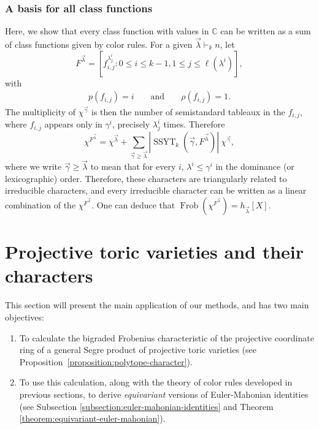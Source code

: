 \documentclass[a4paper,12pt]{amsart}
\theoremstyle{plain}
\theoremstyle{definition}
\theoremstyle{remark}
\DeclareMathOperator{\Frob}{Frob}
\DeclareMathOperator{\SSYT}{SSYT}
\begin{document}
\subsubsection{A basis for all class functions} \label{subsection:basis}
Here, we show that every class function with values in $\mathbb{C}$ can be written as a sum of class functions given by color rules. 
For a given $\vec{\lambda} \vdash_k n$, let 
\[
F^{\vec{\lambda}} = \left[ f_{i,j}^{\lambda^i_j} : 0\leq i \leq k-1 , 1\leq j \leq \ell(\lambda^i)\right],
\]
with 
\begin{align*}
p(f_{i,j}) = i && \text{ and } && \rho(f_{i,j}) = 1.
\end{align*}
The multiplicity of $\chi^{\vec{\gamma}}$ is then the number of semistandard tableaux in the $f_{i,j}$, where $f_{i,j}$ appears only in $\gamma^i$, precisely $\lambda^i_j$ times.
Therefore
\[
\chi^{F^{\vec{\lambda}}} = \chi^{\vec{\lambda}} + \sum_{\vec{\gamma} \geq \vec{\lambda}} |\SSYT_k(\vec{\gamma}, F^{\vec{\lambda}})| ~ \chi^{\vec{\gamma}}, 
\]
where we write $\vec{\gamma} \geq \vec{\lambda}$ to mean that for every $i$, $\lambda^i \leq \gamma^i$ in the dominance (or lexicographic) order.
Therefore, these characters are triangularly related to irreducible characters, and every irreducible character can be written as a linear combination of the $\chi^{F^{\vec{\lambda}}}$. One can deduce that $\Frob(\chi^{F^{\vec{\lambda}}}) = h_{\vec{\lambda}}[X]$.

\section{Projective toric varieties and their characters}\label{section:semigroup-algebras}

This section will present the main application of our methods, and has two main objectives: 
\begin{enumerate}
    \item To calculate the bigraded Frobenius characteristic of the projective coordinate ring of a general Segre product of projective toric varieties (see Proposition~\ref{proposition:polytope-character}).
    
    \item To use this calculation, along with the theory of color rules developed in previous sections, to derive \emph{equivariant} versions of Euler-Mahonian identities (see Subsection \ref{subsection:euler-mahonian-identities} and Theorem \ref{theorem:equivariant-euler-mahonian}).
\end{enumerate}
\end{document}
